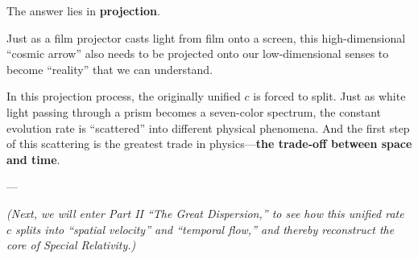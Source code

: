 The answer lies in \textbf{projection}.

Just as a film projector casts light from film onto a screen, this high-dimensional ``cosmic arrow'' also needs to be projected onto our low-dimensional senses to become ``reality'' that we can understand.

In this projection process, the originally unified $c$ is forced to split. Just as white light passing through a prism becomes a seven-color spectrum, the constant evolution rate is ``scattered'' into different physical phenomena. And the first step of this scattering is the greatest trade in physics---\textbf{the trade-off between space and time}.

---

\textit{(Next, we will enter Part II ``The Great Dispersion,'' to see how this unified rate $c$ splits into ``spatial velocity'' and ``temporal flow,'' and thereby reconstruct the core of Special Relativity.)}

